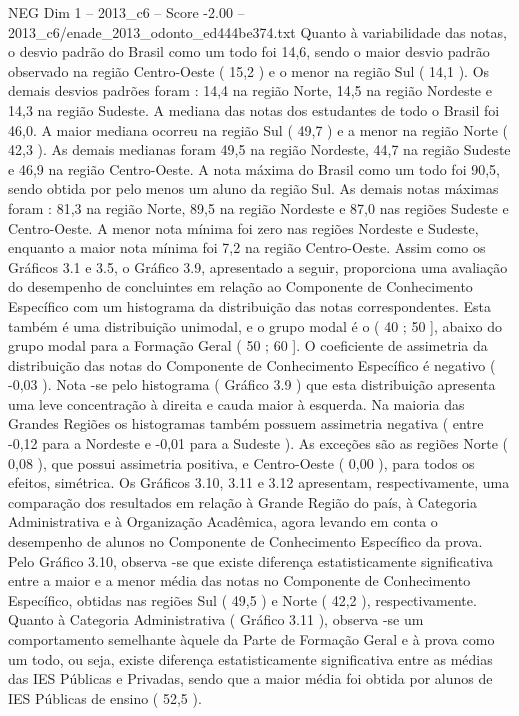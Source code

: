 \begin{textsample}{NEG Dim 1 – 2013\_c6 – Score -2.00 – 2013\_c6/enade\_2013\_odonto\_ed444be374.txt}
Quanto à variabilidade das notas, o desvio padrão do Brasil como um todo foi 14,6, sendo o maior desvio padrão observado na região Centro-Oeste ( 15,2 ) e o menor na região Sul ( 14,1 ).
Os demais desvios padrões foram : 14,4 na região Norte, 14,5 na região Nordeste e 14,3 na região Sudeste.
A mediana das notas dos estudantes de todo o Brasil foi 46,0.
A maior mediana ocorreu na região Sul ( 49,7 ) e a menor na região Norte ( 42,3 ).
As demais medianas foram 49,5 na região Nordeste, 44,7 na região Sudeste e 46,9 na região Centro-Oeste.
A nota máxima do Brasil como um todo foi 90,5, sendo obtida por pelo menos um aluno da região Sul.
As demais notas máximas foram : 81,3 na região Norte, 89,5 na região Nordeste e 87,0 nas regiões Sudeste e Centro-Oeste.
A menor nota mínima foi zero nas regiões Nordeste e Sudeste, enquanto a maior nota mínima foi 7,2 na região Centro-Oeste.
Assim como os Gráficos 3.1 e 3.5, o Gráfico 3.9, apresentado a seguir, proporciona uma avaliação do desempenho de concluintes em relação ao Componente de Conhecimento Específico com um histograma da distribuição das notas correspondentes.
Esta também é uma distribuição unimodal, e o grupo modal é o ( 40 ; 50 ], abaixo do grupo modal para a Formação Geral ( 50 ; 60 ].
O coeficiente de assimetria da distribuição das notas do Componente de Conhecimento Específico é negativo ( -0,03 ).
Nota -se pelo histograma ( Gráfico 3.9 ) que esta distribuição apresenta uma leve concentração à direita e cauda maior à esquerda.
Na maioria das Grandes Regiões os histogramas também possuem assimetria negativa ( entre -0,12 para a Nordeste e -0,01 para a Sudeste ).
As exceções são as regiões Norte ( 0,08 ), que possui assimetria positiva, e Centro-Oeste ( 0,00 ), para todos os efeitos, simétrica.
Os Gráficos 3.10, 3.11 e 3.12 apresentam, respectivamente, uma comparação dos resultados em relação à Grande Região do país, à Categoria Administrativa e à Organização Acadêmica, agora levando em conta o desempenho de alunos no Componente de Conhecimento Específico da prova.
Pelo Gráfico 3.10, observa -se que existe diferença estatisticamente significativa entre a maior e a menor média das notas no Componente de Conhecimento Específico, obtidas nas regiões Sul ( 49,5 ) e Norte ( 42,2 ), respectivamente.
Quanto à Categoria Administrativa ( Gráfico 3.11 ), observa -se um comportamento semelhante àquele da Parte de Formação Geral e à prova como um todo, ou seja, existe diferença estatisticamente significativa entre as médias das IES Públicas e Privadas, sendo que a maior média foi obtida por alunos de IES Públicas de ensino ( 52,5 ).

\end{textsample}

